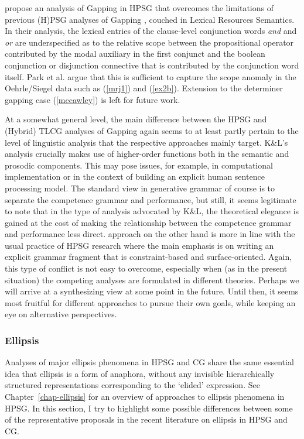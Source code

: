 \documentclass[output=paper]{langsci/langscibook}
\begin{document}
\citet{parkea18gapping} propose an analysis of Gapping in HPSG that
overcomes the limitations of previous (H)PSG analyses of Gapping
\citep{sgww,abeille-ea,chaves05}, couched in Lexical Resources Semantics.
In their analysis, the lexical entries of the clause-level conjunction
words \textit{and} and \textit{or} are underspecified as to the relative scope
between the propositional operator contributed by the modal auxiliary
in the first conjunct and the boolean conjunction or disjunction
connective that is contributed by the conjunction word itself. Park et
al. argue that this is sufficient to capture the scope anomaly in the
Oehrle/Siegel data such as (\ref{mrj1}) and (\ref{ex2b}). Extension to
the determiner gapping case (\ref{mccawley}) is left for future work.

At a somewhat general level, the main difference between the HPSG and
(Hybrid) TLCG analyses of Gapping again seems to at least partly
pertain to the level of linguistic analysis that the respective
approaches mainly target. K\&L's analysis crucially makes use of
higher-order functions both in the semantic and prosodic components.
This may pose issues, for example, in computational implementation or
in the context of building an explicit human sentence processing
model. The standard view in generative grammar of course is to
separate the competence grammar and performance, but still, it seems
legitimate to note that in the type of analysis advocated by K\&L, the
theoretical elegance is gained at the cost of making the relationship
between the competence grammar and performance less direct.
 approach on the other hand is more in line with the
usual practice of HPSG research where the main emphasis is on writing
an explicit grammar fragment that is constraint-based and
surface-oriented. Again, this type of conflict is not easy to
overcome, especially when (as in the present situation) the competing
analyses are formulated in different theories. Perhaps we will arrive
at a synthesizing view at some point in the future. Until then, it
seems most fruitful for different approaches to pursue their own
goals, while keeping an eye on alternative perspectives.


\subsubsection{Ellipsis}

Analyses of major ellipsis phenomena in HPSG and CG share the same
essential idea that ellipsis is a form of anaphora, without any
invisible hierarchically structured representations corresponding to
the `elided' expression. See Chapter~\ref{chap-ellipsis} for an overview of approaches
to ellipsis phenomena in HPSG.
In this section, I try to
highlight some possible differences between some of the representative
proposals in the recent literature on ellipsis in HPSG and CG.
\end{document}
